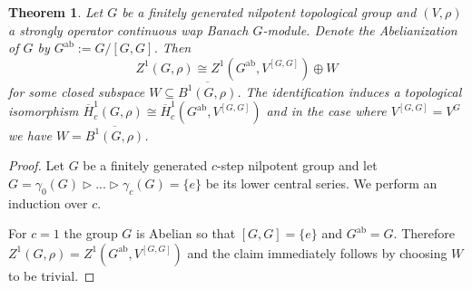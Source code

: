 \documentclass[a4paper,11pt,reqno]{amsart}
\numberwithin{equation}{section}
\newtheorem{theorem}{Theorem}[section]
\theoremstyle{definition}
\theoremstyle{remark}
\theoremstyle{remark}
\begin{document}
\begin{theorem} \label{CommutatorDecomposition} Let $G$ be a finitely generated nilpotent topological group and $(V,\rho)$ a strongly operator continuous wap Banach $G$-module. Denote the Abelianization of $G$ by $G^{\text{ab}}:=G/[G,G]$. Then 
\begin{equation}
Z^{1}(G,\rho)\cong Z^{1}(G^{\text{ab}},V^{[G,G]})\oplus W\label{eq:NilpotentDecomposition}
\end{equation}
for some closed subspace $W\subseteq\overline{B^{1}(G,\rho)}$. The identification induces a topological isomorphism $\overline{H}_{c}^{1}(G,\rho)\cong\overline{H}_{c}^{1}(G^{\text{ab}},V^{[G,G]})$ and in the case where $V^{[G,G]}=V^{G}$ we have $W=\overline{B^{1}(G,\rho)}$. \end{theorem}

\begin{proof} Let $G$ be a finitely generated $c$-step nilpotent group and let $G=\gamma_{0}(G)\triangleright...\triangleright\gamma_{c}(G)=\{e\}$ be its lower central series. We perform an induction over $c$.

For $c=1$ the group $G$ is Abelian so that $[G,G]=\{e\}$ and $G^{\text{ab}}=G$. Therefore $Z^{1}(G,\rho)=Z^{1}(G^{\text{ab}},V^{[G,G]})$ and the claim immediately follows by choosing $W$ to be trivial.


\end{proof}
\end{document}
